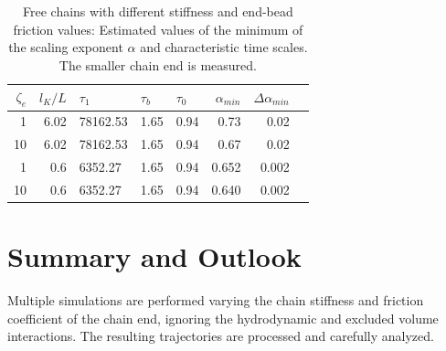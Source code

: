 \documentclass[
    paper=A4,pagesize=automedia,fontsize=12pt,
    BCOR=15mm,DIV=22,
    twoside,headinclude,footinclude=false,
    fleqn,             %
    bibliography=totocnumbered,          %
    listof=totoc,                %
    listof=flat,                 %
    cleardoublepage=empty      %
    numbers=endperiod
]{scrartcl}
\begin{document}
\begin{table}[H]
    \centering
    
    \begin{tabular}{rrlllrrr}
        \toprule
        $\zeta_e$ & $l_K/L$ & $\tau_1$ & $\tau_b$ & $\tau_0$ & $\alpha_{min}$ & $\Delta \alpha_{min}$ \\
        \midrule
        1 & 6.02 & 78162.53 & 1.65 & 0.94 & 0.73 & 0.02 \\
        10 & 6.02 & 78162.53 & 1.65 & 0.94 & 0.67 & 0.02 \\
        1 & 0.6 & 6352.27 & 1.65 & 0.94 & 0.652 & 0.002 \\
        10 & 0.6 & 6352.27 & 1.65 & 0.94 & 0.640 & 0.002 \\
        \bottomrule
        \end{tabular}
    \caption{
        Free chains with different stiffness and end-bead friction values: 
        Estimated values of the minimum of the scaling exponent $\alpha$ and
        characteristic time scales. The smaller chain end is measured.
    }
    \label{table:free_chain_alpha_estimations_fm}
\end{table}

\section{Summary and Outlook}
Multiple simulations 
are performed varying the chain stiffness and friction coefficient of the chain end, 
ignoring the hydrodynamic and excluded volume interactions. 
The resulting trajectories are processed and carefully analyzed. 
\end{document}
